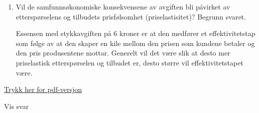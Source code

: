 \documentclass[
  letterpaper,
  DIV=11,
  numbers=noendperiod]{scrartcl}
\providecommand{\tightlist}{%
  \setlength{\itemsep}{0pt}\setlength{\parskip}{0pt}}\usepackage{longtable,booktabs,array}
\begin{document}
\begin{enumerate}
\def\labelenumi{\alph{enumi})}
\setcounter{enumi}{5}
\tightlist
\item
  Vil de samfunnsøkonomiske konsekvensene av avgiften bli påvirket av
  etterspørselens og tilbudets prisfølsomhet (priselastisitet)? Begrunn
  svaret.

  Essensen med stykkavgiften på 6 kroner er at den medfører et
  effektivitetstap som følge av at den skaper en kile mellom den prisen
  som kundene betaler og den pris produsentene mottar. Generelt vil det
  være slik at desto mer priselastisk etterspørselen og tilbudet er,
  desto større vil effektivitetstapet være.
\end{enumerate}

\href{https://github.com/joernih/SFB10816Mikrooekonomi/blob/main/utskrifter/Arbeidskrav_2024_V.pdf}{Trykk
her for pdf-versjon}

Vis svar
\end{document}
